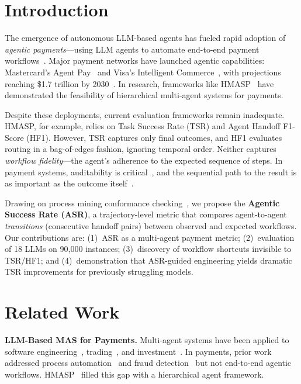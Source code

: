 \documentclass[runningheads]{llncs}
\begin{document}
\section{Introduction}

The emergence of autonomous LLM-based agents has fueled rapid adoption of \textit{agentic payments}---using LLM agents to automate end-to-end payment workflows~\cite{mckinsey2025agenticpayments}. Major payment networks have launched agentic capabilities: Mastercard's Agent Pay~\cite{mastercard2025agentpay} and Visa's Intelligent Commerce~\cite{visa2025intelligentcommerce}, with projections reaching \$1.7 trillion by 2030~\cite{mckinsey2025agenticpayments}. In research, frameworks like HMASP~\cite{chua2025hmasp} have demonstrated the feasibility of hierarchical multi-agent systems for payments.

Despite these deployments, current evaluation frameworks remain inadequate. HMASP, for example, relies on Task Success Rate (TSR) and Agent Handoff F1-Score (HF1). However, TSR captures only final outcomes, and HF1 evaluates routing in a bag-of-edges fashion, ignoring temporal order. Neither captures \textit{workflow fidelity}---the agent's adherence to the expected sequence of steps. In payment systems, auditability is critical~\cite{pcisecurity2025ai}, and the sequential path to the result is as important as the outcome itself~\cite{chen2025benchmarksfail,cemri2025multifail}.

Drawing on process mining conformance checking~\cite{vanderaalst2012conformance,carmona2018conformance}, we propose the \textbf{Agentic Success Rate (ASR)}, a trajectory-level metric that compares agent-to-agent \emph{transitions} (consecutive handoff pairs) between observed and expected workflows.
Our contributions are: (1)~ASR as a multi-agent payment metric; (2)~evaluation of 18 LLMs on 90{,}000 instances; (3)~discovery of workflow shortcuts invisible to TSR/HF1; and (4)~demonstration that ASR-guided engineering yields dramatic TSR improvements for previously struggling models.

\section{Related Work}

\noindent\textbf{LLM-Based MAS for Payments.}
Multi-agent systems have been applied to software engineering~\cite{hong2024metagpt}, trading~\cite{tradingagents2024}, and investment~\cite{yu2024fincon}. In payments, prior work addressed process automation~\cite{guan2024llmprocessautomation} and fraud detection~\cite{dahiphale2024llmscampayments} but not end-to-end agentic workflows. HMASP~\cite{chua2025hmasp} filled this gap with a hierarchical agent framework.
\end{document}
